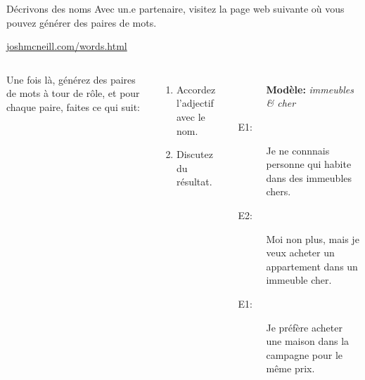 \begin{frame}{Décrivons des noms}
  Avec un.e partenaire, visitez la page web suivante où vous pouvez générer des paires de mots.
  \begin{center}
    \href{https://joshmcneill.com/words.html}{joshmcneill.com/words.html}
  \end{center}
  \begin{columns}
      Une fois là, générez des paires de mots à tour de rôle, et pour chaque paire, faites ce qui suit:
      \begin{enumerate}
        \item Accordez l'adjectif avec le nom.
        \item Discutez du résultat.
      \end{enumerate}
      \begin{description}
        \item[] \textbf{Modèle:} \emph{immeubles \& cher}
        \item[E1:] Je ne connnais personne qui habite dans des \alert{immeubles chers}.
        \item[E2:] Moi non plus, mais je veux acheter un appartement dans un immeuble cher.
        \item[E1:] Je préfère acheter une maison dans la campagne pour le même prix.
      \end{description}
  \end{columns}
\end{frame}